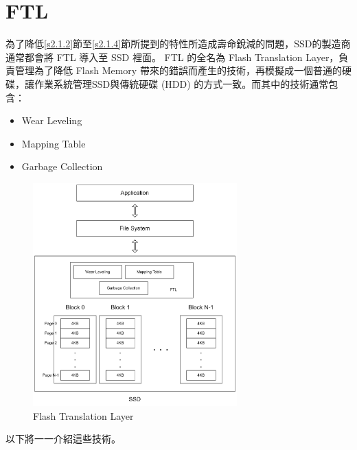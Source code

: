 \section{FTL}\label{s2.2}
\indent
為了降低\ref{s2.1.2}節至\ref{s2.1.4}節所提到的特性所造成壽命銳減的問題，SSD的製造商通常都會將 FTL 導入至 SSD 裡面。
FTL 的全名為 Flash Translation Layer，負責管理為了降低 Flash Memory 帶來的錯誤而產生的技術，再模擬成一個普通的硬碟，讓作業系統管理SSD與傳統硬碟 (HDD) 的方式一致。而其中的技術通常包含：\cite{Boukhobza2014ASA}
\begin{itemize}
    \item Wear Leveling
    \item Mapping Table
    \item Garbage Collection
\end{itemize}
\begin{figure}[H]
    \centering
    \includegraphics[width=0.7\textwidth]{picture/ch2/FTL.png}
    \caption{Flash Translation Layer}
    \label{f2.4}
\end{figure}
以下將一一介紹這些技術。

